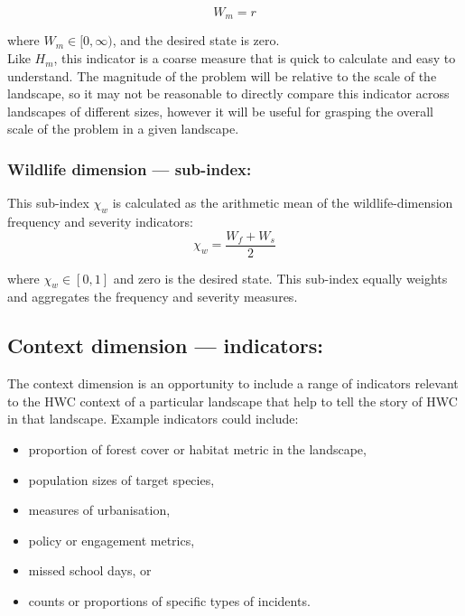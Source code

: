 \documentclass[fleqn,10pt]{olplainarticle}
\begin{document}
\begin{equation*}
    W_m = r
\end{equation*}

where $W_m \in [0,\infty)$, and the desired state is zero.\\

Like $H_m$, this indicator is a coarse measure that is quick to calculate and easy to understand. The magnitude of the problem will be relative to the scale of the landscape, so it may not be reasonable to directly compare this indicator across landscapes of different sizes, however it will be useful for grasping the overall scale of the problem in a given landscape.\\

\subsubsection*{Wildlife dimension --- sub-index:}
This sub-index $\chi_w$ is calculated as the arithmetic mean of  the wildlife-dimension frequency and severity indicators:
\begin{equation*}
    \chi_w = \frac{W_f + W_s}{2}
\end{equation*}

where $\chi_w \in [0,1]$ and zero is the desired state. This sub-index equally weights and aggregates the frequency and severity measures.\\

\subsection*{Context dimension --- indicators:}
The context dimension is an opportunity to include a range of indicators relevant to the HWC context of a particular landscape that help to tell the story of HWC in that landscape. Example indicators could include:
\begin{itemize}
    \item proportion of forest cover or habitat metric in the landscape,
    \item population sizes of target species,
    \item measures of urbanisation,
    \item policy or engagement metrics,
    \item missed school days, or
    \item counts or proportions of specific types of incidents.
\end{itemize}
\end{document}
